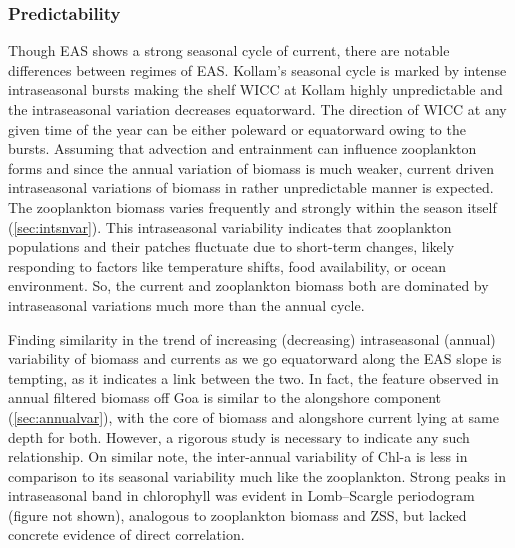 \documentclass{article}
\begin{document}
 	\subsubsection{Predictability}
    Though EAS shows a strong seasonal cycle of current, there are notable differences between regimes of EAS. Kollam's seasonal cycle is marked by intense intraseasonal bursts making the shelf WICC at Kollam highly unpredictable \citep{chaudhuri2021observed} and the intraseasonal variation decreases equatorward. The direction of WICC at any given time of the year can be either poleward or equatorward owing to the bursts. Assuming that advection and entrainment can influence zooplankton forms and since the annual variation of biomass is much weaker, current driven intraseasonal variations of biomass in rather unpredictable manner is expected. The zooplankton biomass varies frequently and strongly within the season itself (\autoref{sec:intsnvar}). This intraseasonal variability indicates that zooplankton populations and their patches fluctuate due to short-term changes, likely responding to factors like temperature shifts, food availability, or ocean environment. So, the current and zooplankton biomass both are dominated by intraseasonal variations much more than the annual cycle. 
    
    Finding similarity in the trend of increasing (decreasing) intraseasonal (annual) variability  of biomass and currents as we go equatorward along the EAS slope is tempting, as it indicates a link between the two. In fact, the feature observed in annual filtered biomass off Goa is similar to the alongshore component (\autoref{sec:annualvar}), with the core of biomass and alongshore current lying at same depth for both. However, a rigorous study is necessary to indicate any such relationship. On similar note, the inter-annual variability of Chl-a is less in comparison to its seasonal variability \citep{shi2022phytoplankton} much like the zooplankton. Strong peaks in intraseasonal band in chlorophyll was evident in Lomb--Scargle periodogram (figure not shown), analogous to zooplankton biomass and ZSS, but lacked concrete evidence of direct correlation.
 	  
 	
\end{document}
